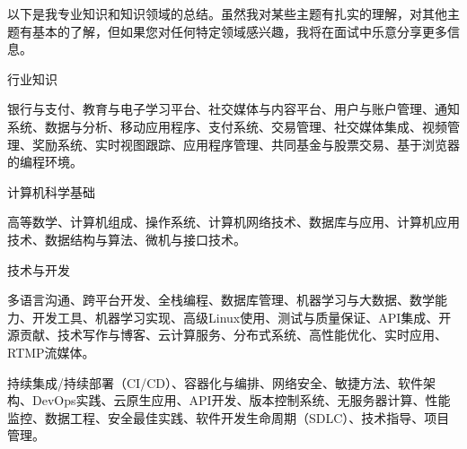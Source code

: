 
\begin{cvparagraph}
  以下是我专业知识和知识领域的总结。虽然我对某些主题有扎实的理解，对其他主题有基本的了解，但如果您对任何特定领域感兴趣，我将在面试中乐意分享更多信息。
\end{cvparagraph}

\begin{cventries}

  \cventry
    {行业知识} %
    {} %
    {} %
    {} %
    {
      \begin{cvitems}
        \item {银行与支付、教育与电子学习平台、社交媒体与内容平台、用户与账户管理、通知系统、数据与分析、移动应用程序、支付系统、交易管理、社交媒体集成、视频管理、奖励系统、实时视图跟踪、应用程序管理、共同基金与股票交易、基于浏览器的编程环境。}
      \end{cvitems}
    }

  \cventry
    {计算机科学基础} %
    {} %
    {} %
    {} %
    {
      \begin{cvitems}
        \item {高等数学、计算机组成、操作系统、计算机网络技术、数据库与应用、计算机应用技术、数据结构与算法、微机与接口技术。}
      \end{cvitems}
    }

  \cventry
    {技术与开发} %
    {} %
    {} %
    {} %
    {
      \begin{cvitems}
        \item {多语言沟通、跨平台开发、全栈编程、数据库管理、机器学习与大数据、数学能力、开发工具、机器学习实现、高级Linux使用、测试与质量保证、API集成、开源贡献、技术写作与博客、云计算服务、分布式系统、高性能优化、实时应用、RTMP流媒体。}
        \item {持续集成/持续部署（CI/CD）、容器化与编排、网络安全、敏捷方法、软件架构、DevOps实践、云原生应用、API开发、版本控制系统、无服务器计算、性能监控、数据工程、安全最佳实践、软件开发生命周期（SDLC）、技术指导、项目管理。}
      \end{cvitems}
    }

\end{cventries}
